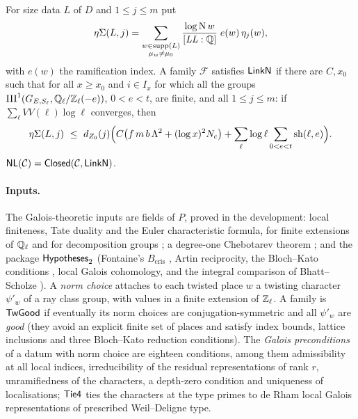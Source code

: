 \begin{definition}\label{def:families:linkN}
For size data $L$ of $D$ and $1\le j\le m$ put
\[
\eta\Sigma(L,j)=\sum_{\substack{w\in\operatorname{supp}(L)\\ \mu_w\ne\mu_0}}\frac{\log\operatorname{N} w}{[\mathit{LL}:\mathbb{Q}]}\;e(w)\,\eta_j(w),
\]
with $e(w)$ the ramification index. A family $\mathcal F$ satisfies $\mathsf{LinkN}$ if there are $C,x_0$ such
that for all $x\ge x_0$ and $i\in I_x$ for which all the groups $\mathrm{III}^1(G_{E,S_\ell},\mathbb{Q}_\ell/\mathbb{Z}_\ell(-e))$, $0<e<t$, are
finite, and all $1\le j\le m$: if $\sum_\ell VV(\ell)\log\ell$ converges, then
\begin{equation}\label{eq:families:linkN}
\eta\Sigma(L,j)\ \le\ d_{Z_0}(j)\Bigl(C\bigl(f\,m\,b\,\Lambda^2+(\log x)^2N_c\bigr)
+\sum_{\ell}\log\ell\sum_{0<e<t}\mathrm{sh}(\ell,e)\Bigr).
\end{equation}
$\mathsf{NL}(\mathcal C)=\mathsf{Closed}(\mathcal C,\mathsf{LinkN})$.
\end{definition}

\paragraph{Inputs.}
The Galois-theoretic inputs are fields of $P$, proved in the development: local finiteness, Tate duality and
the Euler characteristic formula, for finite extensions of $\mathbb{Q}_\ell$ and for decomposition groups
\cite{Tate1963,Serre1997,NeukirchSchmidtWingberg2008}; a degree-one Chebotarev theorem \cite{Chebotarev1926}; and
the package $\mathsf{Hypotheses}_2$ (Fontaine's $B_{\mathrm{cris}}$ \cite{Fontaine1982}, Artin reciprocity, the
Bloch--Kato conditions \cite{BlochKato1990}, local Galois cohomology, and the integral comparison of Bhatt--Scholze
\cite{BhattScholze2022,BhattScholze2023}). A \emph{norm choice} attaches to each twisted place $w$ a twisting
character $\psi'_w$ of a ray class group, with values in a finite extension of $\mathbb{Z}_\ell$. A family is
$\mathsf{TwGood}$ if eventually its norm choices are conjugation-symmetric and all $\psi'_w$ are \emph{good}
(they avoid an explicit finite set of places and satisfy index bounds, lattice inclusions and three Bloch--Kato
reduction conditions). The \emph{Galois preconditions} of a datum with norm choice are eighteen conditions, among
them admissibility at all local indices, irreducibility of the residual representations of rank $r$,
unramifiedness of the characters, a depth-zero condition and uniqueness of localisations; $\mathsf{Tie4}$ ties the
characters at the type primes to de Rham local Galois representations of prescribed Weil--Deligne type.

